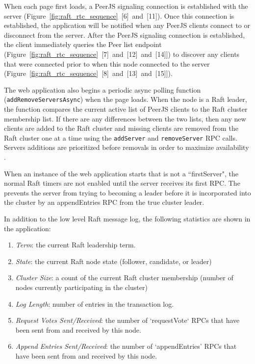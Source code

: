 \documentclass[conference,compsoc]{./IEEEtran/IEEEtran}
\begin{document}
When each page first loads, a PeerJS signaling connection is
established with the server
(Figure~\ref{fig:raft_rtc_sequence}~[6]~and~[11]). Once this
connection is established, the application will be notified when any
PeerJS clients connect to or disconnect from the server.  After the
PeerJS signaling connection is established, the client immediately
queries the Peer list endpoint
(Figure~\ref{fig:raft_rtc_sequence}~[7]~and~[12]~and~[14]]) to discover
any clients that were connected prior to when this node connected to
the server (Figure~\ref{fig:raft_rtc_sequence}~[8]~and~[13]~and~[15]]).

The web application also begins a periodic async polling function
(\texttt{addRemoveServersAsync}) when the page loads. When the node is a Raft
leader, the function compares the current active list of PeerJS clients to
the Raft cluster membership list. If there are any differences between
the two lists, then any new clients are added to the Raft cluster and
missing clients are removed from the Raft cluster one at a time using
the \texttt{addServer} and \texttt{removeServer} RPC calls. Servers
additions are prioritized before removals 
in order to maximize availability
\cite[Section~4.4]{raft_thesis:ongaro14}.

When an instance of the web application starts that is not
a ``firstServer", the normal Raft timers are not enabled until the
server receives its first RPC. The prevents the server from
trying to becoming a leader before it is incorporated into the cluster
by an appendEntries RPC from the true cluster leader.

In addition to the low level Raft message log, the following
statistics are shown in the application:

\begin{enumerate}
\item \emph{Term}: the current Raft leadership term.
\item \emph{State}: the current Raft node state (follower, candidate,
    or leader)
\item \emph{Cluster Size}: a count of the current Raft cluster
    membership (number of nodes currently participating in the
    cluster)
\item \emph{Log Length}: number of entries in the transaction log.
\item \emph{Request Votes Sent/Received}: the number of `requestVote`
    RPCs that have been sent from and received by this node.
\item \emph{Append Entries Sent/Received}: the number of
    `appendEntries' RPCs that have been sent from and received by this
    node.
\end{enumerate}
\end{document}
